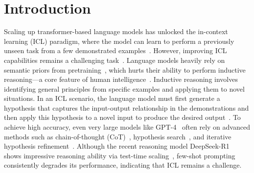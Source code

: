 \section{Introduction}
\label{sec:intro}
Scaling up transformer-based language models has unlocked the in-context learning (ICL) paradigm, where the model can learn to perform a previously unseen task from a few demonstrated examples~\citep{brown2020language,chowdhery2023palm,ouyang2022training}.
However, improving ICL capabilities remains a challenging task~\citep{gendron2024largelanguagemodelsstrong,li2025mirageevaluatingexplaininginductive}.
Language models heavily rely on semantic priors from pretraining~\citep{wei2023larger}, which hurts their ability to perform inductive reasoning—a core feature of human intelligence~\citep{peirce1868questions}.
Inductive reasoning involves identifying general principles from specific examples and applying them to novel situations. In an ICL scenario, the language model must first generate a hypothesis that captures the input-output relationship in the demonstrations and then apply this hypothesis to a novel input to produce the desired output~\citep{wang2023hypothesis,qiu2023phenomenal}.
To achieve high accuracy, even very large models like GPT-4~\citep{openai2024gpt4technicalreport} often rely on advanced methods such as chain-of-thought (CoT)~\citep{li2025mirageevaluatingexplaininginductive}, hypothesis search~\citep{wang2023hypothesis}, and iterative hypothesis refinement~\citep{qiu2023phenomenal}.
Although the recent reasoning model DeepSeek-R1~\citep{guo2025deepseek} shows impressive reasoning ability via test-time scaling~\citep{openai2024openaio1card}, few-shot prompting consistently degrades its performance, indicating that ICL remains a challenge.

